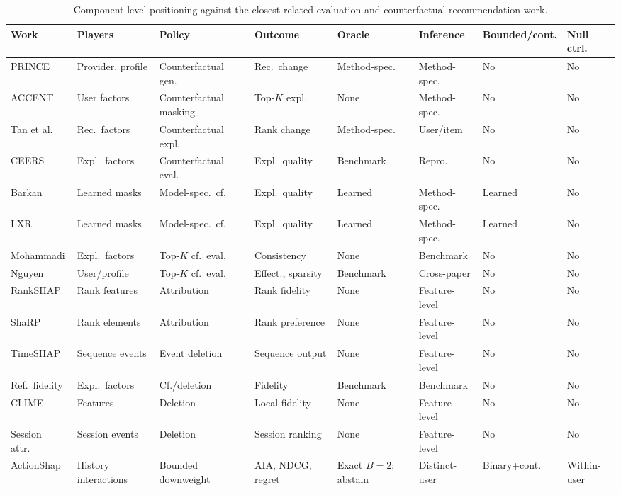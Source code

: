 \documentclass[manuscript,screen,review,anonymous]{acmart}
\begin{document}
\begin{table}[t]
\centering\scriptsize
\caption{Component-level positioning against the closest related evaluation and counterfactual recommendation work.}
\label{tab:related-work-comparison}
\setlength{\tabcolsep}{2pt}
\begin{tabularx}{\linewidth}{@{}>{\raggedright\arraybackslash}p{.14\linewidth}*{7}{>{\raggedright\arraybackslash}X}@{}}
\toprule
Work & Players & Policy & Outcome & Oracle & Inference & Bounded/cont. & Null ctrl. \\
\midrule
PRINCE \cite{ghazimatin2020} & Provider, profile & Counterfactual gen. & Rec.\ change & Method-spec. & Method-spec. & No & No \\
ACCENT \cite{tran2021} & User factors & Counterfactual masking & Top-$K$ expl. & None & Method-spec. & No & No \\
Tan et al. \cite{tan2021} & Rec.\ factors & Counterfactual expl. & Rank change & Method-spec. & User/item & No & No \\
CEERS \cite{baklanov2024} & Expl.\ factors & Counterfactual eval. & Expl.\ quality & Benchmark & Repro. & No & No \\
Barkan \cite{barkan2024} & Learned masks & Model-spec.\ cf. & Expl.\ quality & Learned & Method-spec. & Learned & No \\
LXR \cite{gurevitch2025} & Learned masks & Model-spec.\ cf. & Expl.\ quality & Learned & Method-spec. & Learned & No \\
Mohammadi \cite{mohammadi2025} & Expl.\ factors & Top-$K$ cf.\ eval. & Consistency & None & Benchmark & No & No \\
Nguyen \cite{nguyen2026} & User/profile & Top-$K$ cf.\ eval. & Effect., sparsity & Benchmark & Cross-paper & No & No \\
RankSHAP \cite{chowdhury2024rankshap} & Rank features & Attribution & Rank fidelity & None & Feature-level & No & No \\
ShaRP \cite{pliatsika2025sharpl} & Rank elements & Attribution & Rank preference & None & Feature-level & No & No \\
TimeSHAP \cite{bento2021timeshap} & Sequence events & Event deletion & Sequence output & None & Feature-level & No & No \\
Ref.\ fidelity \cite{baklanov2025fidelity} & Expl.\ factors & Cf./deletion & Fidelity & Benchmark & Benchmark & No & No \\
CLIME \cite{mousavi2023clime} & Features & Deletion & Local fidelity & None & Feature-level & No & No \\
Session attr.\ \cite{bruun2025session} & Session events & Deletion & Session ranking & None & Feature-level & No & No \\
ActionShap & History interactions & Bounded downweight & AIA, NDCG, regret & Exact $B=2$; abstain & Distinct-user & Binary+cont. & Within-user \\
\bottomrule
\end{tabularx}
\end{table}
\end{document}

